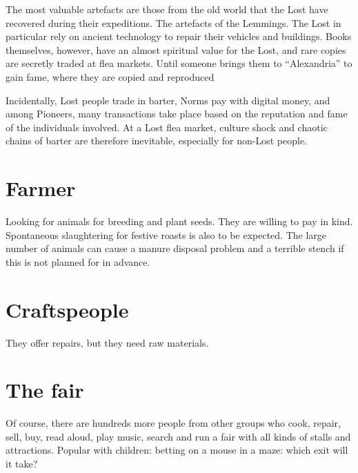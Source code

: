 The most valuable artefacts are those from the old world that the Lost have recovered during their expeditions. The artefacts of the Lemmings. The Lost in particular rely on ancient technology to repair their vehicles and buildings. Books themselves, however, have an almost spiritual value for the Lost, and rare copies are secretly traded at flea markets. Until someone brings them to “Alexandria” to gain fame, where they are copied and reproduced

Incidentally, Lost people trade in barter, Norms pay with digital money, and among Pioneers, many transactions take place based on the reputation and fame of the individuals involved. At a Lost flea market, culture shock and chaotic chains of barter are therefore inevitable, especially for non-Lost people.

\section{Farmer}

Looking for animals for breeding and plant seeds. They are willing to pay in kind. Spontaneous slaughtering for festive roasts is also to be expected. The large number of animals can cause a manure disposal problem and a terrible stench if this is not planned for in advance.

\section{Craftspeople}

They offer repairs, but they need raw materials.

\section{The fair}

Of course, there are hundreds more people from other groups who cook, repair, sell, buy, read aloud, play music, search and run a fair with all kinds of stalls and attractions. Popular with children: betting on a mouse in a maze: which exit will it take?


